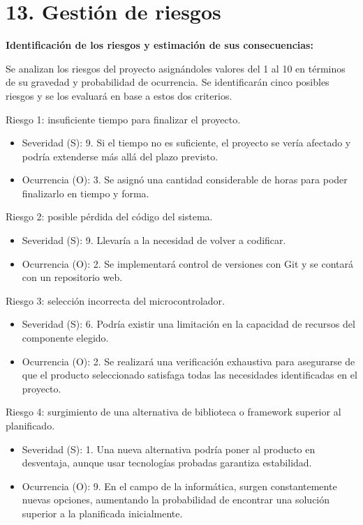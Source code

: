 \documentclass[
11pt, %
]{charter}
\begin{document}
\section{13. Gestión de riesgos}
\label{sec:riesgos}

\textbf{Identificación de los riesgos y estimación de sus consecuencias:}

Se analizan los riesgos del proyecto asignándoles valores del 1 al 10 en términos de su gravedad y probabilidad de ocurrencia. Se identificarán cinco posibles riesgos y se los evaluará en base a estos dos criterios.

Riesgo 1: insuficiente tiempo para finalizar el proyecto.
\begin{itemize}
	\item Severidad (S): 9. Si el tiempo no es suficiente, el proyecto se vería afectado y podría extenderse más allá del plazo previsto.
	\item Ocurrencia (O): 3. Se asignó una cantidad considerable de horas para poder finalizarlo en tiempo y forma.
\end{itemize}

Riesgo 2: posible pérdida del código del sistema.
\begin{itemize}
	\item Severidad (S): 9. Llevaría a la necesidad de volver a codificar.
	\item Ocurrencia (O): 2. Se implementará control de versiones con Git y se contará con un repositorio web.
\end{itemize}

Riesgo 3: selección incorrecta del microcontrolador.
\begin{itemize}
	\item Severidad (S): 6. Podría existir una limitación en la capacidad de recursos del componente elegido.
	\item Ocurrencia (O): 2. Se realizará una verificación exhaustiva para asegurarse de que el producto seleccionado satisfaga todas las necesidades identificadas en el proyecto.
\end{itemize}

Riesgo 4: surgimiento de una alternativa de biblioteca o framework superior al planificado.
\begin{itemize}
	\item Severidad (S): 1. Una nueva alternativa podría poner al producto en desventaja, aunque usar tecnologías probadas garantiza estabilidad.
	\item Ocurrencia (O): 9. En el campo de la informática, surgen constantemente nuevas opciones, aumentando la probabilidad de encontrar una solución superior a la planificada inicialmente.
\end{itemize}
\end{document}
